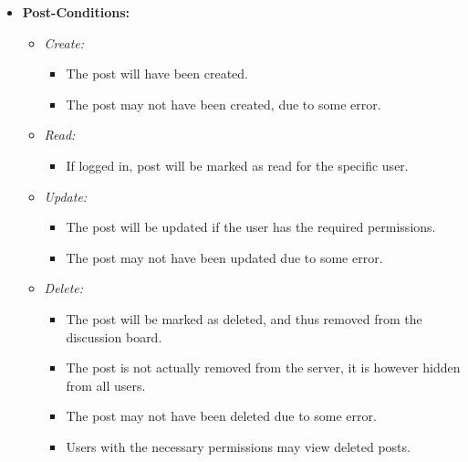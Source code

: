 \documentclass[11pt]{article}
\begin{document}
\begin{enumerate}
\begin{itemize}
\begin{itemize}
		\end{itemize}
		\item \textbf{Post-Conditions: }
		\begin{itemize}
		\item \textit{Create: }
			\begin{itemize}
			\item The post will have been created.
			\item The post may not have been created, due to some error.
			\end{itemize}
		\item \textit{Read: }
			\begin{itemize}
			\item If logged in, post will be marked as read for the 				specific user.
			\end{itemize}
		\item \textit{Update: }
			\begin{itemize}
			\item The post will be updated if the user has the required permissions.
			\item The post may not have been updated due to some error.
			\end{itemize}
		\item \textit{Delete: }
			\begin{itemize}
			\item The post will be marked as deleted, and thus removed 					from the discussion board.
			\item The post is not actually removed from the server, it is however hidden from all users.
		\item The post may not have been deleted due to some error. 
		\item Users with the necessary permissions may view deleted posts.
			\end{itemize}			
			
		\end{itemize}
	
	\end{itemize}
	

\end{enumerate}
\end{document}
